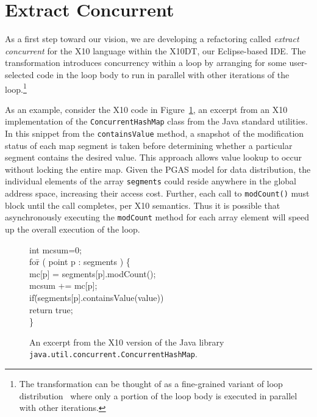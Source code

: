 \section{Extract Concurrent}

As a first step toward our vision, we are developing a refactoring
called {\em extract
concurrent} for the X10 language within the X10DT, our Eclipse-based IDE. 
The transformation introduces concurrency within a loop by arranging
for some user-selected code in the loop body 
to run in parallel with other iterations of the 
loop.\footnote{The transformation can be thought of as
a fine-grained variant of loop distribution~\cite{loopdist} where only
a portion of the loop body is executed in parallel with other iterations.}

As an example, consider the X10 code in Figure~\ref{fig:CHM-X10}, an excerpt from
an X10 implementation of the {\tt ConcurrentHashMap} class from the Java 
standard utilities. In this snippet from the {\tt containsValue} method,
a snapshot of the modification status of each map segment is taken before
determining whether a particular segment contains the desired value. This
approach allows value lookup to occur without locking the entire map. Given
the PGAS model for data distribution, the individual elements of the array 
{\tt segments} could reside anywhere in the global address space, increasing
their access cost. Further, each call to {\tt modCount()} must block until the
call completes, per X10 semantics. Thus it is possible that asynchronously
executing the {\tt modCount} method for each array element will speed up the
overall execution of the loop.

\begin{figure}[tp]
  \begin{code}
int mcsum=0; \\
fo\=r ( point p : segments ) \{ \\
\>  mc[p] = segments[p].modCount(); \\
\>  mcsum += mc[p]; \\
\>  if\=(segments[p].containsValue(value)) \\
\>\>    return true; \\
\}
  \end{code}
\caption{\label{fig:CHM-X10} An excerpt from the X10 version of the Java 
library {\tt java.util.concurrent.ConcurrentHashMap}.  %
}
\end{figure}

